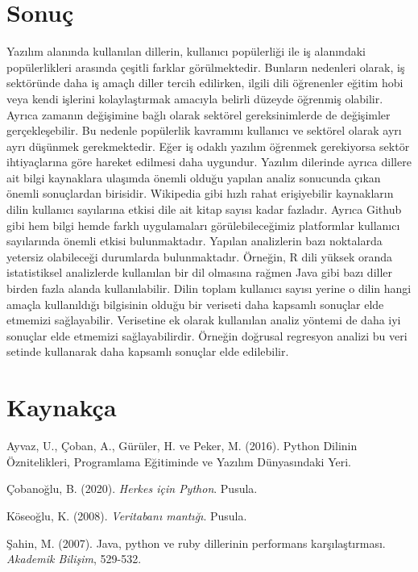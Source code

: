 \documentclass[
  12pt,
]{article}
\newlength{\cslhangindent}
\newlength{\cslentryspacingunit} %
\newenvironment{CSLReferences}[2] %
 {%
  \setlength{\parindent}{0pt}
  \ifodd #1
  \let\oldpar\par
  \def\par{\hangindent=\cslhangindent\oldpar}
  \fi
  \setlength{\parskip}{#2\cslentryspacingunit}
 }%
 {}
\begin{document}
\newpage

\hypertarget{sonuuxe7}{%
\section{Sonuç}\label{sonuuxe7}}

Yazılım alanında kullanılan dillerin, kullanıcı popülerliği ile iş alanındaki popülerlikleri arasında çeşitli farklar görülmektedir. Bunların nedenleri olarak, iş sektöründe daha iş amaçlı diller tercih edilirken, ilgili dili öğrenenler eğitim hobi veya kendi işlerini kolaylaştırmak amacıyla belirli düzeyde öğrenmiş olabilir. Ayrıca zamanın değişimine bağlı olarak sektörel gereksinimlerde de değişimler gerçekleşebilir. Bu nedenle popülerlik kavramını kullanıcı ve sektörel olarak ayrı ayrı düşünmek gerekmektedir. Eğer iş odaklı yazılım öğrenmek gerekiyorsa sektör ihtiyaçlarına göre hareket edilmesi daha uygundur.
Yazılım dilerinde ayrıca dillere ait bilgi kaynaklara ulaşımda önemli olduğu yapılan analiz sonucunda çıkan önemli sonuçlardan birisidir. Wikipedia gibi hızlı rahat erişiyebilir kaynakların dilin kullanıcı sayılarına etkisi dile ait kitap sayısı kadar fazladır. Ayrıca Github gibi hem bilgi hemde farklı uygulamaları görülebileceğimiz platformlar kullanıcı sayılarında önemli etkisi bulunmaktadır.
Yapılan analizlerin bazı noktalarda yetersiz olabileceği durumlarda bulunmaktadır. Örneğin, R dili yüksek oranda istatistiksel analizlerde kullanılan bir dil olmasına rağmen Java gibi bazı diller birden fazla alanda kullanılabilir. Dilin toplam kullanıcı sayısı yerine o dilin hangi amaçla kullanıldığı bilgisinin olduğu bir veriseti daha kapsamlı sonuçlar elde etmemizi sağlayabilir. Verisetine ek olarak kullanılan analiz yöntemi de daha iyi sonuçlar elde etmemizi sağlayabilirdir. Örneğin doğrusal regresyon analizi bu veri setinde kullanarak daha kapsamlı sonuçlar elde edilebilir.

\newpage

\hypertarget{references}{%
\section{Kaynakça}\label{references}}

\hypertarget{refs}{}
\begin{CSLReferences}{1}{0}
\leavevmode{}%
Ayvaz, U., Çoban, A., Gürüler, H. ve Peker, M. (2016). Python Dilinin {Ö}znitelikleri, Programlama E{ğ}itiminde ve Yaz{ı}l{ı}m D{ü}nyas{ı}ndaki Yeri.

\leavevmode{}%
Çobanoğlu, B. (2020). \emph{Herkes i{ç}in Python}. Pusula.

\leavevmode{}%
Köseoğlu, K. (2008). \emph{Veritaban{ı} mant{ı}{ğ}{ı}}. Pusula.

\leavevmode{}%
Şahin, M. (2007). Java, python ve ruby dillerinin performans kar{ş}{ı}la{ş}t{ı}rmas{ı}. \emph{Akademik Bili{ş}im}, 529-532.

\end{CSLReferences}
\end{document}
